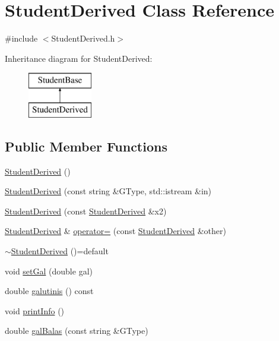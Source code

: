 \hypertarget{class_student_derived}{}\section{Student\+Derived Class Reference}
\label{class_student_derived}


{\ttfamily \#include $<$Student\+Derived.\+h$>$}

Inheritance diagram for Student\+Derived\+:\begin{figure}[H]
\begin{center}
\leavevmode
\includegraphics[height=2.000000cm]{class_student_derived}
\end{center}
\end{figure}
\subsection*{Public Member Functions}
\begin{DoxyCompactItemize}
\item 
\mbox{\hyperlink{class_student_derived_a4973839c7d096e6c35b9783e3fe6bf85}{Student\+Derived}} ()
\item 
\mbox{\hyperlink{class_student_derived_ae5a350a75a5555304df23a2d1c37b52c}{Student\+Derived}} (const string \&G\+Type, std\+::istream \&in)
\item 
\mbox{\hyperlink{class_student_derived_ab3424c39db6405828691800f395ba06b}{Student\+Derived}} (const \mbox{\hyperlink{class_student_derived}{Student\+Derived}} \&x2)
\item 
\mbox{\hyperlink{class_student_derived}{Student\+Derived}} \& \mbox{\hyperlink{class_student_derived_aec705037a02dabdf675f62420d5fd611}{operator=}} (const \mbox{\hyperlink{class_student_derived}{Student\+Derived}} \&other)
\item 
\mbox{\hyperlink{class_student_derived_ab82e183e7428ca1f19f2219bc3b119f4}{$\sim$\+Student\+Derived}} ()=default
\item 
void \mbox{\hyperlink{class_student_derived_a62c621c84c78a94a6e8ad53e03e9c3ef}{set\+Gal}} (double gal)
\item 
double \mbox{\hyperlink{class_student_derived_a44e33a50e90bd21a1b161d67277789f3}{galutinis}} () const
\item 
void \mbox{\hyperlink{class_student_derived_a7c84acecf565c70e2a6d4bfd1c60f7c1}{print\+Info}} ()
\item 
double \mbox{\hyperlink{class_student_derived_a93af5f3ffa604f0b9481fcaaeac238a0}{gal\+Balas}} (const string \&G\+Type)
\end{DoxyCompactItemize}
